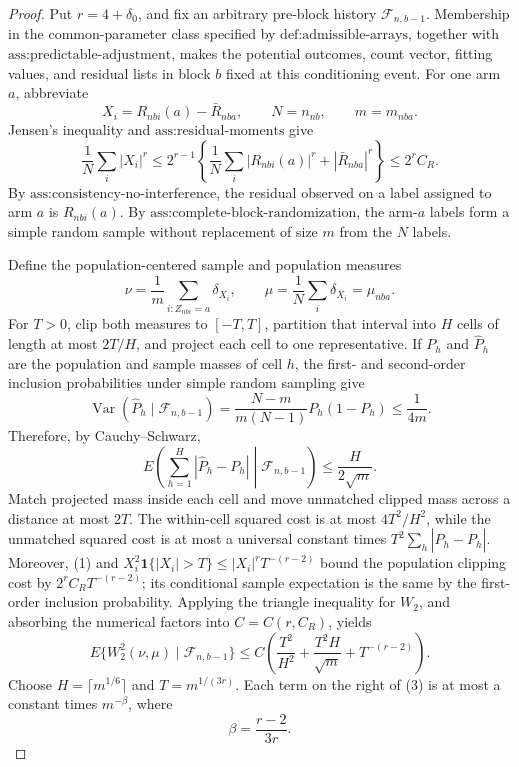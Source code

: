\documentclass{article}
\begin{document}
\begin{proof}
Put \(r=4+\delta_0\), and fix an arbitrary pre-block history \(\mathcal F_{n,b-1}\). Membership in the common-parameter class specified by \(\text{def:admissible-arrays}\), together with \(\text{ass:predictable-adjustment}\), makes the potential outcomes, count vector, fitting values, and residual lists in block \(b\) fixed at this conditioning event. For one arm \(a\), abbreviate
\[
X_i=R_{nbi}(a)-\bar R_{nba},\qquad N=n_{nb},\qquad m=m_{nba}.
\]
Jensen's inequality and \(\text{ass:residual-moments}\) give
\[
\frac1N\sum_i|X_i|^r
\le 2^{r-1}\left\{\frac1N\sum_i|R_{nbi}(a)|^r+|\bar R_{nba}|^r\right\}
\le 2^r C_R.
\tag{1}
\]
By \(\text{ass:consistency-no-interference}\), the residual observed on a label assigned to arm \(a\) is \(R_{nbi}(a)\). By \(\text{ass:complete-block-randomization}\), the arm-\(a\) labels form a simple random sample without replacement of size \(m\) from the \(N\) labels.

Define the population-centered sample and population measures
\[
\nu=\frac1m\sum_{i:Z_{nbi}=a}\delta_{X_i},
\qquad
\mu=\frac1N\sum_i\delta_{X_i}=\mu_{nba}.
\]
For \(T>0\), clip both measures to \([-T,T]\), partition that interval into \(H\) cells of length at most \(2T/H\), and project each cell to one representative. If \(P_h\) and \(\widehat P_h\) are the population and sample masses of cell \(h\), the first- and second-order inclusion probabilities under simple random sampling give
\[
\operatorname{Var}(\widehat P_h\mid\mathcal F_{n,b-1})
=\frac{N-m}{m(N-1)}P_h(1-P_h)\le\frac1{4m}.
\]
Therefore, by Cauchy--Schwarz,
\[
E\left(\sum_{h=1}^H|\widehat P_h-P_h|\middle|\mathcal F_{n,b-1}\right)
\le\frac{H}{2\sqrt m}.
\tag{2}
\]
Match projected mass inside each cell and move unmatched clipped mass across a distance at most \(2T\). The within-cell squared cost is at most \(4T^2/H^2\), while the unmatched squared cost is at most a universal constant times \(T^2\sum_h|\widehat P_h-P_h|\). Moreover, (1) and
\(X_i^2\mathbf 1\{|X_i|>T\}\le |X_i|^rT^{-(r-2)}\) bound the population clipping cost by \(2^rC_RT^{-(r-2)}\); its conditional sample expectation is the same by the first-order inclusion probability. Applying the triangle inequality for \(W_2\), and absorbing the numerical factors into \(C=C(r,C_R)\), yields
\[
E\{W_2^2(\nu,\mu)\mid\mathcal F_{n,b-1}\}
\le C\left(\frac{T^2}{H^2}+\frac{T^2H}{\sqrt m}+T^{-(r-2)}\right).
\tag{3}
\]
Choose \(H=\lceil m^{1/6}\rceil\) and \(T=m^{1/(3r)}\). Each term on the right of (3) is at most a constant times \(m^{-\beta}\), where
\[
\beta=\frac{r-2}{3r}.
\tag{4}
\]


\end{proof}
\end{document}
